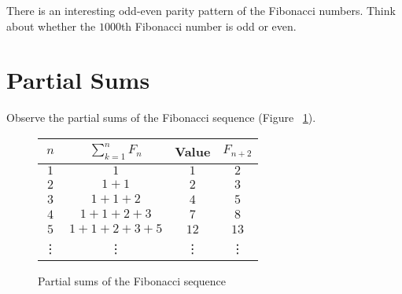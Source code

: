 \documentclass[a4paper,10pt]{report}
\begin{document}
There is an interesting odd-even parity pattern of the Fibonacci numbers. Think
about whether the $1000$th Fibonacci number is odd or even.

\section{Partial Sums}

Observe the partial sums of the Fibonacci sequence (Figure
~\ref{fib:partialsums}).

\begin{figure}
 \begin{tabular}{|c|c|c|c|}
  \hline
  $n$ & $\displaystyle \sum_{k=1}^n F_n$ & Value & $F_{n+2}$ \\
  \hline
  $1$ & $1$ & $1$ & $2$ \\
  $2$ & $1+1$ & $2$ & $3$ \\
  $3$ & $1+1+2$ & $4$ & $5$ \\
  $4$ & $1+1+2+3$ & $7$ & $8$ \\
  $5$ & $1+1+2+3+5$ & $12$ & $13$ \\
  \vdots & \vdots & \vdots & \vdots \\
  \hline
 \end{tabular}

 \caption{Partial sums of the Fibonacci sequence}

 \label{fib:partialsums}
\end{figure}

\printglossaries

\cleardoublepage
{}
\listoffigures
\end{document}
